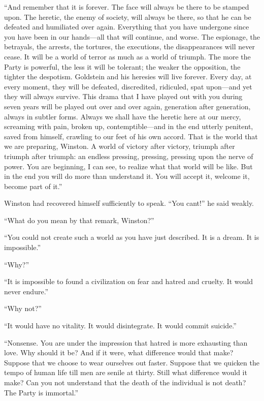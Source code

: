 ``And remember that it is forever. The face will always be there to be
stamped upon. The heretic, the enemy of society, will always be there,
so that he can be defeated and humiliated over again. Everything that
you have undergone since you have been in our hands---all that will
continue, and worse. The espionage, the betrayals, the arrests, the
tortures, the executions, the disappearances will never cease. It will
be a world of terror as much as a world of triumph. The more the Party
is powerful, the less it will be tolerant; the weaker the opposition,
the tighter the despotism. Goldstein and his heresies will live forever.
Every day, at every moment, they will be defeated, discredited,
ridiculed, spat upon---and yet they will always survive. This drama that
I have played out with you during seven years will be played out over
and over again, generation after generation, always in subtler forms.
Always we shall have the heretic here at our mercy, screaming with pain,
broken up, contemptible---and in the end utterly penitent, saved from
himself, crawling to our feet of his own accord. That is the world that
we are preparing, Winston. A world of victory after victory, triumph
after triumph after triumph: an endless pressing, pressing, pressing
upon the nerve of power. You are beginning, I can see, to realize what
that world will be like. But in the end you will do more than understand
it. You will accept it, welcome it, become part of it.''

Winston had recovered himself sufficiently to speak. ``You
can\textquotesingle t!'' he said weakly.

``What do you mean by that remark, Winston?''

``You could not create such a world as you have just described. It is a
dream. It is impossible.''

``Why?''

``It is impossible to found a civilization on fear and hatred and
cruelty. It would never endure.''

``Why not?''

``It would have no vitality. It would disintegrate. It would commit
suicide.''

``Nonsense. You are under the impression that hatred is more exhausting
than love. Why should it be? And if it were, what difference would that
make? Suppose that we choose to wear ourselves out faster. Suppose that
we quicken the tempo of human life till men are senile at thirty. Still
what difference would it make? Can you not understand that the death of
the individual is not death? The Party is immortal.''

